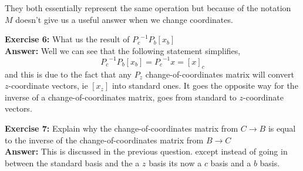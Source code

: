 \documentclass{amsart}
\begin{document}
They both essentially represent the same operation but because of the notation $M$ doesn't give us a useful answer when we change coordinates.\\
\vspace{.1in}


\noindent\textbf{Exercise 6: } What us the result of ${P_c}^{-1}P_b[x_b]$\\
\noindent \textbf{Answer: } Well we can see that the following statement simplifies,
\begin{equation*}
{P_c}^{-1}P_b[x_b]={P_c}^{-1}x=[x]_c
\end{equation*}
and this is due to the fact that any $P_z$ change-of-coordinates matrix will convert $z$-coordinate vectors, ie $[x_z]$ into standard ones. It goes the opposite way for the inverse of a change-of-coordinates matrix, goes from standard to $z$-coordinate vectors.
\vspace{.1in}

\noindent\textbf{Exercise 7: } Explain why the change-of-coordinates matrix from $C \to B$ is equal to the inverse of the  change-of-coordinates matrix from $B \to C$\\
\noindent \textbf{Answer: } This is discussed in the previous question. except instead of going in between the standard basis and the a $z$ basis its now a $c$ basis and a $b$ basis.
\end{document}
